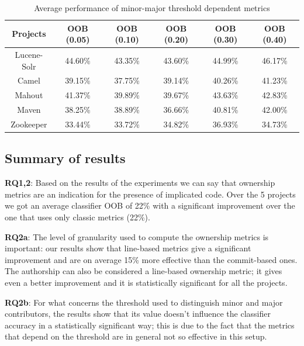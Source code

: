 \begin{table}[ht]
\centering
\caption{Average performance of minor-major threshold dependent metrics}
\label{tab:resultexp2}
\begin{tabular}{|c|c|c|c|c|c|}
\hline
\textbf{Projects} & \textbf{OOB (0.05)} & \textbf{OOB (0.10)} & \textbf{OOB (0.20)} & \textbf{OOB (0.30)} & \textbf{OOB (0.40)} \\
\hline
Lucene-Solr & 44.60\% & 43.35\% & 43.60\% & 44.99\% & 46.17\% \\
Camel & 39.15\% & 37.75\% & 39.14\% & 40.26\% & 41.23\% \\
Mahout & 41.37\% & 39.89\% & 39.67\% & 43.63\% & 42.83\% \\
Maven & 38.25\% & 38.89\% & 36.66\% & 40.81\% & 42.00\% \\
Zookeeper & 33.44\% & 33.72\% & 34.82\% & 36.93\% & 34.73\% \\
\hline
\end{tabular}
\end{table}


\subsection{Summary of results}


\textbf{RQ1,2}: Based on the results of the experiments we can say that ownership metrics are an indication for the presence of implicated code. Over the 5 projects we got an average classifier OOB of 22\% with a significant improvement over the one that uses only classic metrics (22\%).

\textbf{RQ2a}: The level of granularity used to compute the ownership metrics is important: our results show that line-based metrics give a significant improvement and are on average 15\% more effective than the commit-based ones. The authorship can also be considered a line-based ownership metric; it gives even a better improvement and it is statistically significant for all the projects. %

\textbf{RQ2b}: For what concerns the threshold used to distinguish minor and major contributors, the results show that its value doesn't influence the classifier accuracy in a statistically significant way; this is due to the fact that the metrics that depend on the threshold are in general not so effective in this setup.

